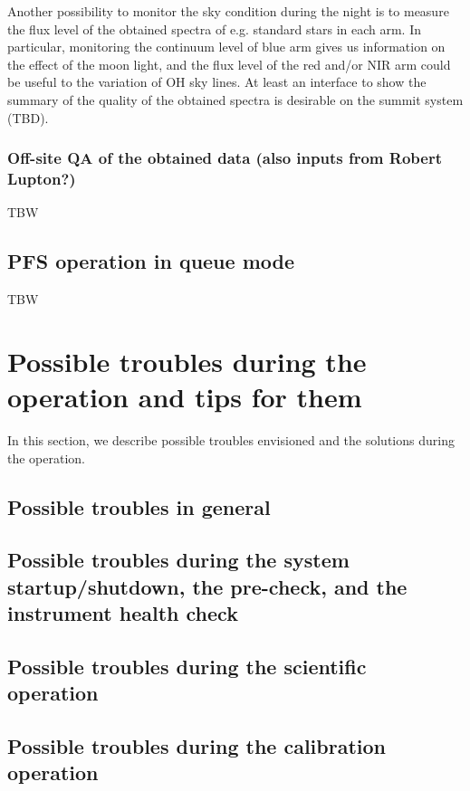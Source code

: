 \documentclass[a4paper]{article}
\begin{document}
Another possibility to monitor the sky condition during the night is
to measure the flux level of the obtained spectra of e.g. standard
stars in each arm. In particular, monitoring the continuum level of
blue arm gives us information on the effect of the moon light, and the
flux level of the red and/or NIR arm could be useful to the variation
of OH sky lines. At least an interface to show the summary of the
quality of the obtained spectra is desirable on the summit system
(TBD).\\

\subsubsection{Off-site QA of the obtained data (also inputs from Robert Lupton?)}
TBW

\subsection{PFS operation in queue mode}
TBW 

\section{Possible troubles during the operation and tips for them}
In this section, we describe possible troubles envisioned and the
solutions during the operation.
\subsection{Possible troubles in general}
\subsection{Possible troubles during the system startup/shutdown, the pre-check, and the instrument health check}
\subsection{Possible troubles during the scientific operation}
\subsection{Possible troubles during the calibration operation}
\end{document}
